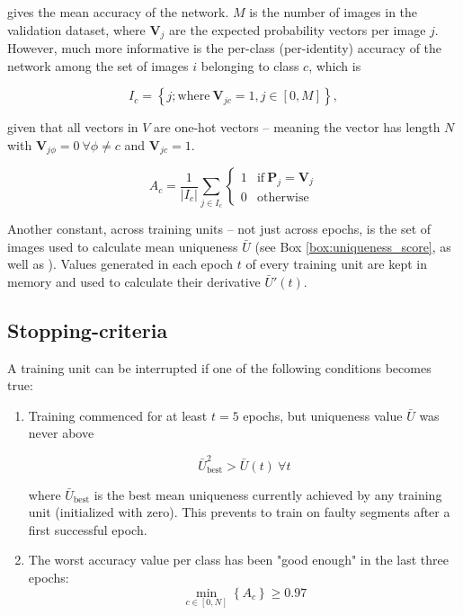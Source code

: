 \documentclass[9pt,lineno]{elife}
\newcommand*\mean[1]{\bar{#1}}
\begin{document}
\begin{appendixbox}
gives the mean accuracy of the network. $M$ is the number of images in the validation dataset, where $\mathbf{V}_j$ are the expected probability vectors per image $j$. However, much more informative is the per-class (per-identity) accuracy of the network among the set of images $i$ belonging to class $c$, which is

$$ I_c = \left\{ j; \mathrm{where}\ \mathbf{V}_{jc} = 1, j \in [0,M] \right\}, $$

given that all vectors in $V$ are one-hot vectors -- meaning the vector has length $N$ with $\mathbf{V}_{j\phi} = 0\ \forall \phi \not= c$ and $\mathbf{V}_{jc} = 1$.

$$ A_c = \frac1{|I_c|}\sum_{j\in I_c} \begin{cases} 1 & \mathrm{if}\ \mathbf{P}_j = \mathbf{V}_j \\ 0 & \mathrm{otherwise} \end{cases} $$

Another constant, across training units -- not just across epochs, is the set of images used to calculate mean uniqueness $\mean{U}$ (see Box \ref{box:uniqueness_score}, as well as ). Values generated in each epoch $t$ of every training unit are kept in memory and used to calculate their derivative $\mean{U}'(t)$.

\subsection{Stopping-criteria} \label{sec:recognition_stopping}

A training unit can be interrupted if one of the following conditions becomes true:

\begin{enumerate}
    \item Training commenced for at least $t=5$ epochs, but uniqueness value $\mean{U}$ was never above
    
    $$ \mean{U}_\mathrm{best}^2 > \mean{U}(t)\ \forall t $$
    
    where $\mean{U}_\mathrm{best}$ is the best mean uniqueness currently achieved by any training unit (initialized with zero). This prevents to train on faulty segments after a first successful epoch.
    
    \item The worst accuracy value per class has been "good enough" in the last three epochs: 
    $$ \min_{c\in [0,N]} \left\{ A_c \right\} \geq 0.97 $$
    

\end{enumerate}
\end{appendixbox}
\end{document}
